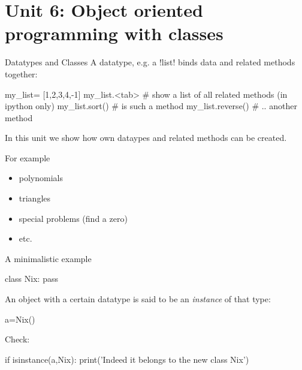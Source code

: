\documentclass[hyperref={pdfpagelabels=false},table]{beamer}
\begin{document}
\part{Unit 6: Object oriented programming with classes}






\begin{frame}[fragile]{Datatypes and Classes}
A datatype, e.g. a \pyth!list! binds data and related methods
together:

\begin{python}
my_list= [1,2,3,4,-1]
my_list.<tab> #  show a list of all related methods (in ipython only)
my_list.sort()  # is such a method
my_list.reverse() # .. another method
\end{python}

In this unit we show how own dataypes and related methods can be created.

For example
\begin{itemize}
\item polynomials
\item triangles
\item special problems (find a zero)
\item etc.
\end{itemize}
\end{frame}
\begin{frame}[fragile]{A minimalistic example}
\begin{python}
class Nix:
    pass
\end{python}

An object  with a certain datatype is said to be
an \emph{instance} of that type:

\begin{python}
a=Nix()
\end{python}

Check:
\begin{python}
 if isinstance(a,Nix):
    print('Indeed it belongs to the new class Nix')
\end{python}
\end{frame}
\end{document}
